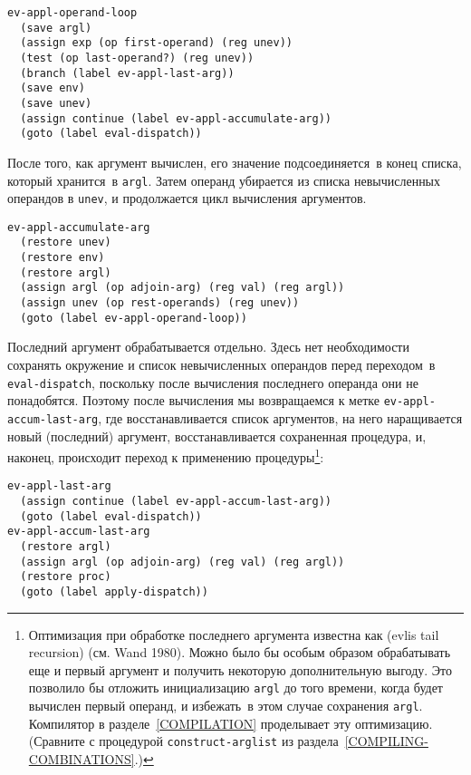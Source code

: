 \begin{Verbatim}[fontsize=\small]
ev-appl-operand-loop
  (save argl)
  (assign exp (op first-operand) (reg unev))
  (test (op last-operand?) (reg unev))
  (branch (label ev-appl-last-arg))
  (save env)
  (save unev)
  (assign continue (label ev-appl-accumulate-arg))
  (goto (label eval-dispatch))
\end{Verbatim}

После того, как аргумент вычислен, его значение
подсоединяется~в конец списка, который хранится~в {\tt argl}.
Затем операнд убирается из списка невычисленных операндов в
{\tt unev}, и продолжается цикл вычисления аргументов.

\begin{Verbatim}[fontsize=\small]
ev-appl-accumulate-arg
  (restore unev)
  (restore env)
  (restore argl)
  (assign argl (op adjoin-arg) (reg val) (reg argl))
  (assign unev (op rest-operands) (reg unev))
  (goto (label ev-appl-operand-loop))
\end{Verbatim}

Последний аргумент обрабатывается отдельно.  Здесь нет
необходимости сохранять окружение и список невычисленных операндов
перед переходом~в {\tt eval-dispatch}, поскольку после
вычисления последнего операнда они не понадобятся.  Поэтому после
вычисления мы возвращаемся к метке
{\tt ev-appl-ac\-cum-last-arg}, где восстанавливается список
аргументов, на него наращивается новый (последний) аргумент,
восстанавливается сохраненная процедура, и, наконец, происходит
переход к применению процедуры\footnote{Оптимизация при обработке последнего аргумента
известна как  (evlis tail recursion) (см. Wand 1980).  
Можно было бы
особым образом обрабатывать еще и первый аргумент и получить некоторую
дополнительную выгоду.  Это позволило бы отложить инициализацию
{\tt argl} до того времени, когда будет вычислен первый операнд, и
избежать~в этом случае сохранения {\tt argl}.  Компилятор в
разделе~\ref{COMPILATION} проделывает эту оптимизацию.
(Сравните с процедурой {\tt construct-arglist} из 
раздела~\ref{COMPILING-COMBINATIONS}.)
}:

\begin{Verbatim}[fontsize=\small]
ev-appl-last-arg
  (assign continue (label ev-appl-accum-last-arg))
  (goto (label eval-dispatch))
ev-appl-accum-last-arg
  (restore argl)
  (assign argl (op adjoin-arg) (reg val) (reg argl))
  (restore proc)
  (goto (label apply-dispatch))
\end{Verbatim}

